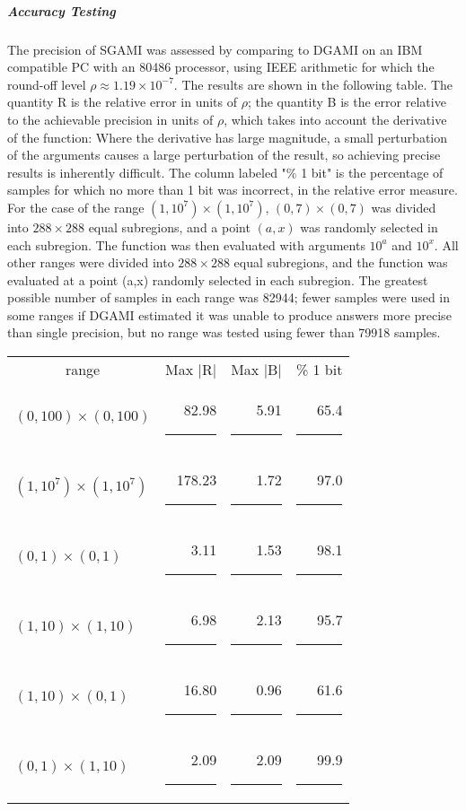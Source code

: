 \documentclass[twoside]{MATH77}
\begin{document}
\subparagraph{Accuracy Testing}

The precision of SGAMI was assessed by comparing to DGAMI on an IBM
compatible PC with an 80486 processor, using IEEE arithmetic for which
the round-off level $\rho \approx 1.19 \times 10^{-7}$.  The results
are shown in the following table.  The quantity R is the relative error
in units of $\rho $; the quantity B is the error relative to the achievable
precision in units of $\rho $, which takes into account the derivative
of the function:  Where the derivative has large magnitude, a small
perturbation of the arguments causes a large perturbation of the result,
so achieving precise results is inherently difficult.  The column labeled
"\% 1 bit" is the percentage of samples for which no more than 1 bit was
incorrect, in the relative error measure.  For the case of the range
$(1, 10^7) \times (1, 10^7)$, $(0, 7) \times (0, 7)$ was divided into
$288 \times 288$ equal subregions, and a point $(a, x)$ was randomly selected
in each subregion.  The function was then evaluated with arguments
$10^a$ and $10^x$.  All other ranges were divided into $288 \times 288$ equal
subregions, and the function was evaluated at a point (a,x) randomly selected
in each subregion. The greatest possible number of samples in each range was
82944; fewer samples were used in some ranges if DGAMI estimated it was
unable to produce answers more precise than single precision, but no range was
tested using fewer than 79918 samples.

\begin{tabular}{lrrr}
\multicolumn{1}{c}{range} & \multicolumn{1}{c}{Max $|$R$|$} &
\multicolumn{1}{c}{Max $|$B$|$} & \multicolumn{1}{c}{\% 1 bit}\\
$(0, 100) \times (0,100)$ &   82.98 \rule{.03in}{0pt} &
5.91 \rule{.07in}{0pt} & 65.4 \rule{.05in}{0pt} \\
$(1,10^7) \times (1,10^7)$ & 178.23 \rule{.03in}{0pt} &
1.72 \rule{.07in}{0pt} & 97.0 \rule{.05in}{0pt} \\
$(0,1) \times (0,1)$ &         3.11 \rule{.03in}{0pt} &
1.53 \rule{.07in}{0pt} & 98.1 \rule{.05in}{0pt} \\
$(1,10) \times (1,10)$ &       6.98 \rule{.03in}{0pt} &
2.13 \rule{.07in}{0pt} & 95.7 \rule{.05in}{0pt} \\
$(1,10) \times (0,1)$ &       16.80 \rule{.03in}{0pt} &
0.96 \rule{.07in}{0pt} & 61.6 \rule{.05in}{0pt} \\
$(0,1) \times (1,10)$ &        2.09 \rule{.03in}{0pt} &
2.09 \rule{.07in}{0pt} & 99.9 \rule{.05in}{0pt} \\
\end{tabular}
\end{document}
